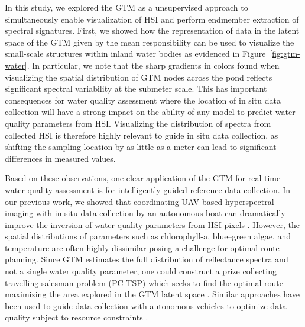 In this study, we explored the GTM as a unsupervised approach to simultaneously enable visualization of HSI and perform endmember extraction of spectral signatures. First, we showed how the representation of data in the latent space of the GTM given by the mean responsibility can be used to visualize the small-scale structures within inland water bodies as evidenced in Figure~\ref{fig:gtm-water}. In particular, we note that the sharp gradients in colors found when visualizing the spatial distribution of GTM nodes across the pond reflects significant spectral variability at the submeter scale. %
This has important consequences for water quality assessment where the location of in situ data collection will have a strong impact on the ability of any model to predict water quality parameters from HSI. Visualizing the distribution of spectra from collected HSI is therefore highly relevant to guide in situ data collection, as shifting the sampling location by as little as a meter can lead to significant differences in measured values. 

Based on these observations, one clear application of the GTM for real-time
water quality assessment is for intelligently guided reference data collection.
In our previous work, we showed that coordinating UAV-based hyperspectral
imaging with in situ data collection by an autonomous boat can dramatically
improve the inversion of water quality parameters from HSI pixels
\cite{robot-team-2}. However, the spatial distributions of parameters such as
chlorophyll-a, blue--green algae, and temperature are often highly dissimilar
posing a challenge for optimal route planning. Since  GTM estimates the full
distribution of reflectance spectra and not a single water quality parameter,
one could construct a prize collecting travelling salesman problem (PC-TSP)
which seeks to find the optimal route maximizing the area explored in the GTM
latent space \cite{balas2007prize}. Similar approaches have been used to guide
data collection with autonomous vehicles to optimize data quality subject to
resource constraints \cite{suryan2020learning}.

